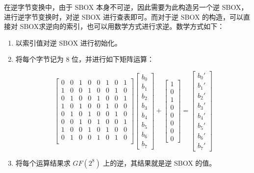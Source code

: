 \documentclass[a4paper, zihao=-4, UTF-8]{ctexart}
\begin{document}
	在逆字节变换中，由于 SBOX 本身不可逆，因此需要为此构造另一个逆 SBOX，进行逆字节变换时，对逆 SBOX 进行查表即可。而对于逆 SBOX 的构造，可以直接对 SBOX求逆向的索引，也可以用数学方式进行求逆。数学方式如下：
	
	\begin{enumerate}
		\item 以索引值对逆 SBOX 进行初始化。
		\item 将每个字节记为 8 位，并进行如下矩阵运算：
		
		$$\left[\begin{matrix}
			0 & 0 & 1 & 0 & 0 & 1 & 0 & 1\\
			1 & 0 & 0 & 1 & 0 & 0 & 1 & 0\\
			0 & 1 & 0 & 0 & 1 & 0 & 0 & 1\\
			1 & 0 & 1 & 0 & 0 & 1 & 0 & 0\\
			0 & 1 & 0 & 1 & 0 & 0 & 1 & 0\\
			0 & 0 & 1 & 0 & 1 & 0 & 0 & 1\\
			1 & 0 & 0 & 1 & 0 & 1 & 0 & 0\\
			0 & 1 & 0 & 0 & 1 & 0 & 1 & 0\\
			\end{matrix}\right]\left[\begin{matrix}
			b_0 \\ b_1 \\ b_2 \\ b_3 \\ b_4 \\ b_5 \\ b_6 \\ b_7
			\end{matrix}\right]+\left[\begin{matrix}
			1 \\ 0 \\ 1 \\ 0 \\ 0 \\ 0 \\ 0 \\ 0
			\end{matrix}\right]=\left[\begin{matrix}
			b_0' \\ b_1' \\ b_2' \\ b_3' \\ b_4' \\ b_5' \\ b_6' \\ b_7'
		\end{matrix}\right]$$
		
		\item 将每个运算结果求 $GF(2^8)$ 上的逆，其结果就是逆 SBOX 的值。
	\end{enumerate}
	
\end{document}
